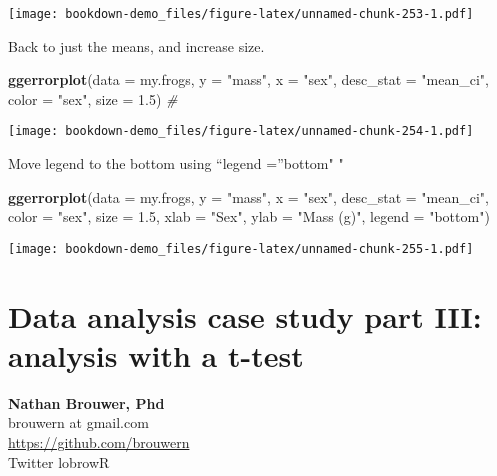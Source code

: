 \documentclass[]{book}
\newenvironment{Shaded}{\begin{snugshade}}{\end{snugshade}}
\newcommand{\KeywordTok}[1]{\textcolor[rgb]{0.13,0.29,0.53}{\textbf{#1}}}
\newcommand{\DataTypeTok}[1]{\textcolor[rgb]{0.13,0.29,0.53}{#1}}
\newcommand{\FloatTok}[1]{\textcolor[rgb]{0.00,0.00,0.81}{#1}}
\newcommand{\StringTok}[1]{\textcolor[rgb]{0.31,0.60,0.02}{#1}}
\newcommand{\CommentTok}[1]{\textcolor[rgb]{0.56,0.35,0.01}{\textit{#1}}}
\newcommand{\NormalTok}[1]{#1}
\theoremstyle{definition}
\theoremstyle{definition}
\theoremstyle{definition}
\theoremstyle{remark}
\begin{document}
\texttt{[image: bookdown-demo\_files/figure-latex/unnamed-chunk-253-1.pdf]}

Back to just the means, and increase size.

\begin{Shaded}
\begin{Highlighting}[]
\KeywordTok{ggerrorplot}\NormalTok{(}\DataTypeTok{data =}\NormalTok{ my.frogs,}
          \DataTypeTok{y =} \StringTok{"mass"}\NormalTok{,}
          \DataTypeTok{x =} \StringTok{"sex"}\NormalTok{,}
          \DataTypeTok{desc_stat =} \StringTok{"mean_ci"}\NormalTok{,}
          \DataTypeTok{color =} \StringTok{"sex"}\NormalTok{,}
          \DataTypeTok{size =} \FloatTok{1.5}\NormalTok{) }\CommentTok{#}
\end{Highlighting}
\end{Shaded}

\texttt{[image: bookdown-demo\_files/figure-latex/unnamed-chunk-254-1.pdf]}

Move legend to the bottom using ``legend =''bottom" "

\begin{Shaded}
\begin{Highlighting}[]
\KeywordTok{ggerrorplot}\NormalTok{(}\DataTypeTok{data =}\NormalTok{ my.frogs,}
          \DataTypeTok{y =} \StringTok{"mass"}\NormalTok{,}
          \DataTypeTok{x =} \StringTok{"sex"}\NormalTok{,}
          \DataTypeTok{desc_stat =} \StringTok{"mean_ci"}\NormalTok{,}
          \DataTypeTok{color =} \StringTok{"sex"}\NormalTok{,}
          \DataTypeTok{size =} \FloatTok{1.5}\NormalTok{,}
          \DataTypeTok{xlab =} \StringTok{"Sex"}\NormalTok{,}
          \DataTypeTok{ylab =} \StringTok{"Mass (g)"}\NormalTok{,}
          \DataTypeTok{legend =} \StringTok{"bottom"}\NormalTok{) }
\end{Highlighting}
\end{Shaded}

\texttt{[image: bookdown-demo\_files/figure-latex/unnamed-chunk-255-1.pdf]}

\chapter{Data analysis case study part III: analysis with a
t-test}\label{data-analysis-case-study-part-iii-analysis-with-a-t-test}

\textbf{Nathan Brouwer, Phd}\\
brouwern at gmail.com\\
\url{https://github.com/brouwern}\\
Twitter lobrowR
\end{document}
